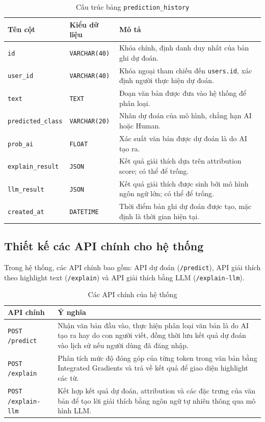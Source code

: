 \begin{table}[H]
\centering
\caption{Cấu trúc bảng \texttt{prediction\_history}}
\label{tab:prediction-history-schema}
\begin{tabular}{|p{}|p{}|p{}|}
\hline
\textbf{Tên cột} & \textbf{Kiểu dữ liệu} & \textbf{Mô tả} \\
\hline
\texttt{id} & \texttt{VARCHAR(40)} & Khóa chính, định danh duy nhất của bản ghi dự đoán. \\
\hline
\texttt{user\_id} & \texttt{VARCHAR(40)} & Khóa ngoại tham chiếu đến \texttt{users.id}, xác định người thực hiện dự đoán. \\
\hline
\texttt{text} & \texttt{TEXT} & Đoạn văn bản được đưa vào hệ thống để phân loại. \\
\hline
\texttt{predicted\_class} & \texttt{VARCHAR(20)} & Nhãn dự đoán của mô hình, chẳng hạn AI hoặc Human. \\
\hline
\texttt{prob\_ai} & \texttt{FLOAT} & Xác suất văn bản được dự đoán là do AI tạo ra. \\
\hline
\texttt{explain\_result} & \texttt{JSON} & Kết quả giải thích dựa trên attribution score; có thể để trống. \\
\hline
\texttt{llm\_result} & \texttt{JSON} & Kết quả giải thích được sinh bởi mô hình ngôn ngữ lớn; có thể để trống. \\
\hline
\texttt{created\_at} & \texttt{DATETIME} & Thời điểm bản ghi dự đoán được tạo, mặc định là thời gian hiện tại. \\
\hline
\end{tabular}
\end{table}

\subsection{Thiết kế các API chính cho hệ thống}
Trong hệ thống, các API chính bao gồm: API dự đoán (\texttt{/predict}), API giải thích theo highlight text (\texttt{/explain}) và API giải thích
bằng LLM (\texttt{/explain-llm}).

\begin{table}[H]
    \centering
    \caption{Các API chính của hệ thống}
    \label{tab:main-apis}
    \begin{tabular}{|p{}|p{}|}
        \hline
        \textbf{API chính} & \textbf{Ý nghĩa} \\
        \hline
        \texttt{POST /predict} & Nhận văn bản đầu vào, thực hiện phân loại văn bản là do AI tạo ra hay do con người viết, đồng thời lưu kết quả dự đoán vào lịch sử nếu người dùng đã đăng nhập. \\
        \hline
        \texttt{POST /explain} & Phân tích mức độ đóng góp của từng token trong văn bản bằng Integrated Gradients và trả về kết quả để giao diện highlight các từ. \\
        \hline
        \texttt{POST /explain-llm} & Kết hợp kết quả dự đoán, attribution và các đặc trưng của văn bản để tạo lời giải thích bằng ngôn ngữ tự nhiên thông qua mô hình LLM. \\
        \hline
    \end{tabular}
\end{table}

